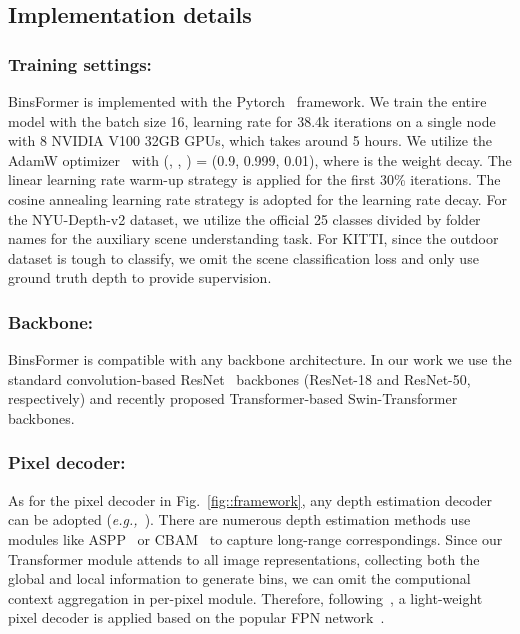 \documentclass[runningheads]{llncs}
\begin{document}
\subsection{Implementation details}
\subsubsection{Training settings:} BinsFormer is implemented with the Pytorch~\cite{paszke2019pytorch} framework. We train the entire model with the batch size 16, learning rate  for 38.4k iterations on a single node with 8 NVIDIA V100 32GB GPUs, which takes around 5 hours. We utilize the AdamW optimizer~\cite{kingma2014adam} with (, , ) = (0.9, 0.999, 0.01), where  is the weight decay. The linear learning rate warm-up strategy is applied for the first 30\% iterations. The cosine annealing learning rate strategy is adopted for the learning rate decay. For the NYU-Depth-v2 dataset, we utilize the official 25 classes divided by folder names for the auxiliary scene understanding task. For KITTI, since the outdoor dataset is tough to classify, we omit the scene classification loss and only use ground truth depth to provide supervision.

\subsubsection{Backbone:} BinsFormer is compatible with any backbone architecture. In our work we use the standard convolution-based ResNet~\cite{he2016resenet} backbones (ResNet-18 and ResNet-50, respectively) and recently proposed Transformer-based Swin-Transformer~\cite{liu2021swin} backbones.

\subsubsection{Pixel decoder:} As for the pixel decoder in Fig.~\ref{fig::framework}, any depth estimation decoder can be adopted (\textit{e.g.,}~\cite{fu2018dorn,lee2019bts,alhashim2018densedepth}). There are numerous depth estimation methods use modules like ASPP~\cite{chen2017deeplab} or CBAM~\cite{woo2018cbam} to capture long-range correspondings. Since our Transformer module attends to all image representations, collecting both the global and local information to generate bins, we can omit the computional context aggregation in per-pixel module. Therefore, following~\cite{cheng2021maskformer}, a light-weight pixel decoder is applied based on the popular FPN network~\cite{lin2017fpn}.   
\end{document}
